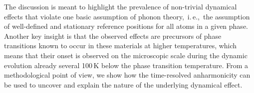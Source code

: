 The discussion is meant to highlight the prevalence of non-trivial dynamical effects that violate one basic assumption of phonon theory,~i.\,e.,~the assumption of well-defined and stationary reference positions for all atoms in a given phase. Another key insight is that the observed effects are precursors of phase transitions known to occur in these materials at higher temperatures, which means that their onset is observed on the microscopic scale during the dynamic evolution already several 100\,K below the phase transition temperature.
From a methodological point of view, we show how the time-resolved anharmonicity can be used to uncover and explain the nature of the underlying dynamical effect.




